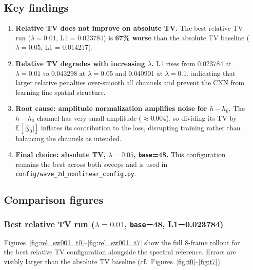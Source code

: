 \documentclass[11pt,a4paper]{article}
\begin{document}
\subsection{Key findings}

\begin{enumerate}
  \item \textbf{Relative TV does not improve on absolute TV.}
    The best relative TV run ($\lambda=0.01$, L1 = 0.023784) is \textbf{67\% worse}
    than the absolute TV baseline ($\lambda=0.05$, L1 = 0.014217).

  \item \textbf{Relative TV degrades with increasing $\lambda$.}
    L1 rises from 0.023784 at $\lambda=0.01$ to 0.043298 at $\lambda=0.05$
    and 0.040901 at $\lambda=0.1$, indicating that larger relative penalties
    over-smooth all channels and prevent the CNN from learning fine spatial structure.

  \item \textbf{Root cause: amplitude normalization amplifies noise for $h-h_0$.}
    The $h-h_0$ channel has very small amplitude ($\approx 0.004$), so dividing its TV
    by $\mathbb{E}[\lvert\hat{y}_0\rvert]$ inflates its contribution to the loss,
    disrupting training rather than balancing the channels as intended.

  \item \textbf{Final choice: absolute TV, $\lambda=0.05$, \texttt{base}=48.}
    This configuration remains the best across both sweeps and is used in
    \texttt{config/wave\_2d\_nonlinear\_config.py}.
\end{enumerate}

\subsection{Comparison figures}

\subsubsection{Best relative TV run ($\lambda=0.01$, \texttt{base}=48, L1=0.023784)}

Figures~\ref{fig:rel_sw001_t0}--\ref{fig:rel_sw001_t7} show the full 8-frame rollout
for the best relative TV configuration alongside the spectral reference.
Errors are visibly larger than the absolute TV baseline (cf.\ Figures~\ref{fig:t0}--\ref{fig:t7}).
\end{document}
